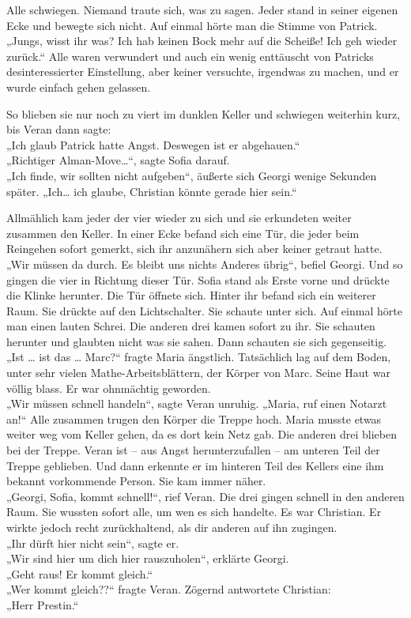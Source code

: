 \documentclass[oneside]{memoir}
\begin{document}
Alle schwiegen. Niemand traute sich, was zu sagen. Jeder stand in seiner eigenen Ecke und bewegte sich nicht.
Auf einmal hörte man die Stimme von Patrick. \\
„Jungs, wisst ihr was? Ich hab keinen Bock mehr auf die Scheiße! 
Ich geh wieder zurück.“
Alle waren verwundert und auch ein wenig enttäuscht von Patricks desinteressierter Einstellung, aber keiner versuchte, irgendwas zu machen, und er wurde einfach gehen gelassen.

So blieben sie nur noch zu viert im dunklen Keller und schwiegen weiterhin kurz, bis Veran dann sagte:  \\
„Ich glaub Patrick hatte Angst. Deswegen ist er abgehauen.“ \\
„Richtiger Alman-Move\ldots“, sagte Sofia darauf. \\
„Ich finde, wir sollten nicht aufgeben“, äußerte sich Georgi wenige Sekunden später. „Ich\ldots{} ich glaube, Christian könnte gerade hier sein.“

Allmählich kam jeder der vier wieder zu sich und sie erkundeten weiter zusammen den Keller.
In einer Ecke befand sich eine Tür, die jeder beim Reingehen sofort gemerkt, sich ihr anzunähern sich aber keiner getraut hatte.  \\
„Wir müssen da durch. Es bleibt uns nichts Anderes übrig“, befiel Georgi.
Und so gingen die vier in Richtung dieser Tür.
Sofia stand als Erste vorne und drückte die Klinke herunter. Die Tür öffnete sich. Hinter ihr befand sich ein weiterer Raum. Sie drückte auf den Lichtschalter. Sie schaute unter sich.
Auf einmal hörte man einen lauten Schrei.
Die anderen drei kamen sofort zu ihr. Sie schauten herunter und glaubten nicht was sie sahen. Dann schauten sie sich gegenseitig. \\
„Ist \ldots{} ist das \ldots{} Marc?“ fragte Maria ängstlich.
Tatsächlich lag auf dem Boden, unter sehr vielen Mathe-Arbeitsblättern,
der Körper von Marc. Seine Haut war völlig blass. Er war ohnmächtig geworden. \\
„Wir müssen schnell handeln“, sagte Veran unruhig. „Maria, ruf einen Notarzt an!“
Alle zusammen trugen den Körper die Treppe hoch. Maria musste etwas weiter weg vom Keller gehen, da es dort kein Netz gab. Die anderen drei blieben bei der Treppe. Veran ist -- aus Angst herunterzufallen -- am unteren Teil der Treppe geblieben.
Und dann erkennte er im hinteren Teil des Kellers eine ihm bekannt vorkommende Person. Sie kam immer näher. \\
„Georgi, Sofia, kommt schnell!“, rief Veran. Die drei gingen schnell in den anderen Raum. Sie wussten sofort alle, um wen es sich handelte.
Es war Christian.
Er wirkte jedoch recht zurückhaltend, als dir anderen auf ihn zugingen. \\
„Ihr dürft hier nicht sein“, sagte er. \\
„Wir sind hier um dich hier rauszuholen“, erklärte Georgi. \\
„Geht raus! Er kommt gleich.“ \\
„Wer kommt gleich??“ fragte Veran.
Zögernd antwortete Christian: \\
„Herr Prestin.“
\end{document}
